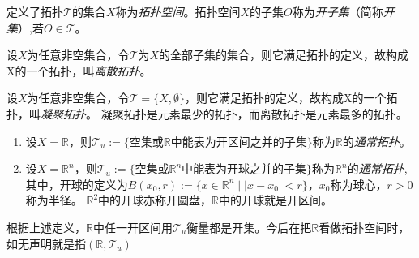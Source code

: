 \begin{definition}
定义了拓扑$\mathscr{T}$的集合$X$称为\emph{拓扑空间}。拓扑空间$X$的子集$O$称为\emph{开子集}（简称\emph{开集}）,若$O \in \mathscr{T}$。
\end{definition}

\begin{example}
设$X$为任意非空集合，令$\mathscr{T}$为$X$的全部子集的集合，则它满足拓扑的定义，故构成X的一个拓扑，叫\emph{离散拓扑}。
\end{example}

\begin{example}
设$X$为任意非空集合，令$\mathscr{T} = \{X, \emptyset\}$，则它满足拓扑的定义，故构成X的一个拓扑，叫\emph{凝聚拓扑}。
凝聚拓扑是元素最少的拓扑，而离散拓扑是元素最多的拓扑。
\end{example}

\begin{example}
\begin{enumerate}[（1）]
\item 设$X = \mathbb{R}$，则$\mathscr{T}_u := \{\text{空集或}\mathbb{R}\text{中能表为开区间之并的子集}\}$称为$\mathbb{R}$的\emph{通常拓扑}。
\item 设$X = \mathbb{R}^n$，则$\mathscr{T}_u := \{\text{空集或}\mathbb{R}^n\text{中能表为开球之并的子集}\}$称为$\mathbb{R}^n$的\emph{通常拓扑},
其中，开球的定义为$B(x_0, r) := \{x \in \mathbb{R}^n \mid |x - x_0| < r\}$，$x_0$称为球心，$r > 0$称为半径。
$\mathbb{R}^2$中的开球亦称开圆盘，$\mathbb{R}$中的开球就是开区间。
\end{enumerate}
根据上述定义，$\mathbb{R}$中任一开区间用$\mathscr{T}_u$衡量都是开集。今后在把$\mathbb{R}$看做拓扑空间时，如无声明就是指$(\mathbb{R}, \mathscr{T}_u)$
\end{example}
